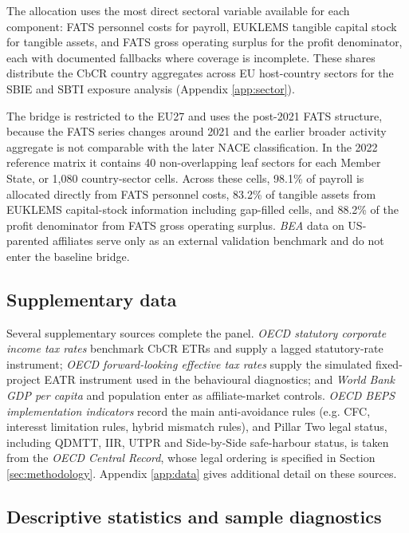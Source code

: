 \documentclass[11pt,a4paper]{article}
\begin{document}
The allocation uses the most direct sectoral variable available for each component: FATS personnel costs for payroll, EUKLEMS tangible capital stock for tangible assets, and FATS gross operating surplus for the profit denominator, each with documented fallbacks where coverage is incomplete. These shares distribute the CbCR country aggregates across EU host-country sectors for the SBIE and SBTI exposure analysis (Appendix \ref{app:sector}).

The bridge is restricted to the EU27 and uses the post-2021 FATS structure, because the FATS series changes around 2021 and the earlier broader activity aggregate is not comparable with the later NACE classification. In the 2022 reference matrix it contains 40 non-overlapping leaf sectors for each Member State, or 1{,}080 country-sector cells. Across these cells, 98.1\% of payroll is allocated directly from FATS personnel costs, 83.2\% of tangible assets from EUKLEMS capital-stock information including gap-filled cells, and 88.2\% of the profit denominator from FATS gross operating surplus. \emph{BEA} data on US-parented affiliates serve only as an external validation benchmark and do not enter the baseline bridge.

\subsection{Supplementary data}\label{sec:supplementary}

Several supplementary sources complete the panel. \emph{OECD statutory corporate income tax rates} benchmark CbCR ETRs and supply a lagged statutory-rate instrument; \emph{OECD forward-looking effective tax rates} supply the simulated fixed-project EATR instrument used in the behavioural diagnostics; and \emph{World Bank GDP per capita} and population enter as affiliate-market controls. \emph{OECD BEPS implementation indicators} record the main anti-avoidance rules (e.g. CFC, interesst limitation rules, hybrid mismatch rules), and Pillar Two legal status, including QDMTT, IIR, UTPR and Side-by-Side safe-harbour status, is taken from the \emph{OECD Central Record}, whose legal ordering is specified in Section \ref{sec:methodology}. Appendix \ref{app:data} gives additional detail on these sources. 

\subsection{Descriptive statistics and sample diagnostics}\label{sec:data_diagnostics}
\end{document}
